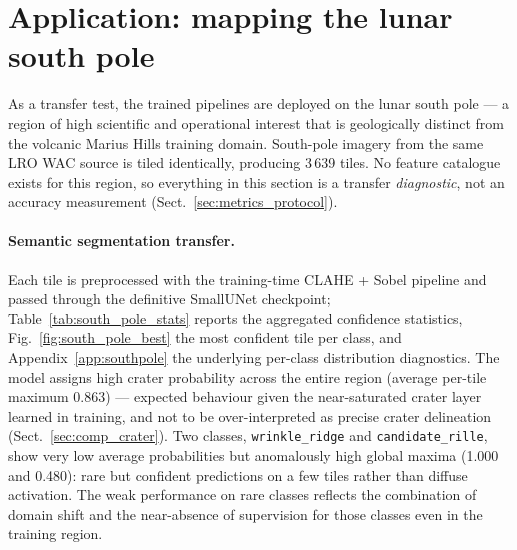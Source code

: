\documentclass{aa}
\begin{document}
\section{Application: mapping the lunar south pole}
\label{sec:southpole}

As a transfer test, the trained pipelines are deployed on the lunar south pole --- a region of high scientific and operational interest that is geologically distinct from the volcanic Marius Hills training domain. South-pole imagery from the same LRO WAC source is tiled identically, producing 3\,639 tiles. No feature catalogue exists for this region, so everything in this section is a transfer \emph{diagnostic}, not an accuracy measurement (Sect.~\ref{sec:metrics_protocol}).

\paragraph{Semantic segmentation transfer.}
Each tile is preprocessed with the training-time CLAHE + Sobel pipeline and passed through the definitive SmallUNet checkpoint; Table~\ref{tab:south_pole_stats} reports the aggregated confidence statistics, Fig.~\ref{fig:south_pole_best} the most confident tile per class, and Appendix~\ref{app:southpole} the underlying per-class distribution diagnostics. The model assigns high crater probability across the entire region (average per-tile maximum 0.863) --- expected behaviour given the near-saturated crater layer learned in training, and not to be over-interpreted as precise crater delineation (Sect.~\ref{sec:comp_crater}). Two classes, \texttt{wrinkle\_ridge} and \texttt{candidate\_rille}, show very low average probabilities but anomalously high global maxima (1.000 and 0.480): rare but confident predictions on a few tiles rather than diffuse activation. The weak performance on rare classes reflects the combination of domain shift and the near-absence of supervision for those classes even in the training region.
\end{document}
